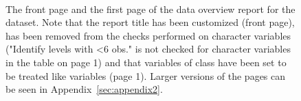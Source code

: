\documentclass[article,shortnames]{jss}
\begin{document}
\begin{figure}[tb]
\begin{center}
\\
\end{center}
\caption{The front page and the first page of the data overview report for the  dataset. Note that the report title has been customized (front page),  has been removed from the checks performed on character variables ("Identify levels with <6 obs." is not checked for character variables in the table on page 1) and that variables of class  have been set to be treated like  variables (page 1). Larger versions of the pages can be seen in
  Appendix~\ref{sec:appendix2}.}
\label{fig:bigExampleP01}
\end{figure}
\end{document}
